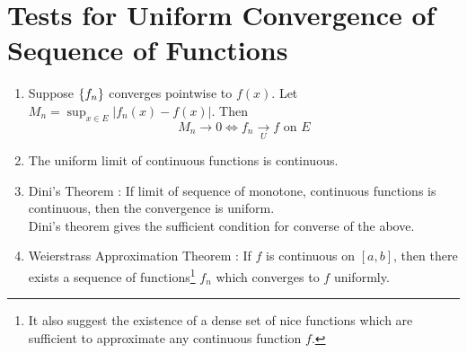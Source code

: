 \section{Tests for Uniform Convergence of Sequence of Functions}
\begin{enumerate}
	\item Suppose $\{f_n\}$ converges pointwise to $f(x)$. Let $M_n = \sup_{x \in E} |f_n(x) - f(x)|$. Then 
		$$M_n \to 0 \iff f_n \underset{U}{\to} f \text{ on } E$$
	\item The uniform limit of continuous functions is continuous.
	\item Dini's Theorem : If limit of sequence of monotone, continuous functions is continuous, then the convergence is uniform.\\
	Dini's theorem gives the sufficient condition for converse of the above.
	\item Weierstrass Approximation Theorem : If $f$ is continuous on $[a,b]$, then there exists a sequence of functions\footnote{It also suggest the existence of a dense set of nice functions which are sufficient to approximate any continuous function $f$.} $f_n$ which converges to $f$ uniformly.
\end{enumerate}

